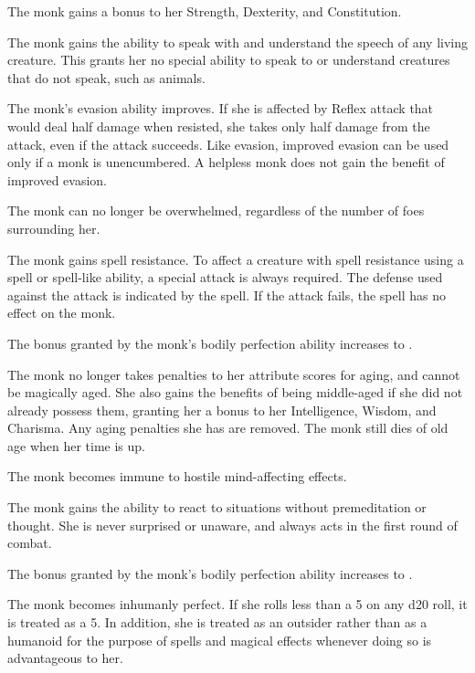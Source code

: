  The monk gains a  bonus to her Strength, Dexterity, and Constitution.

 The monk gains the ability to speak with and understand the speech of any living creature. This grants her no special ability to speak to or understand creatures that do not speak, such as animals.

 The monk's evasion ability improves. If she is affected by Reflex attack that would deal half damage when resisted, she takes only half damage from the attack, even if the attack succeeds. Like evasion, improved evasion can be used only if a monk is unencumbered. A helpless monk does not gain the benefit of improved evasion.

 The monk can no longer be overwhelmed, regardless of the number of foes surrounding her.

 The monk gains spell resistance. To affect a creature with spell resistance using a spell or spell-like ability, a special attack is always required. The defense used against the attack is indicated by the spell. If the attack fails, the spell has no effect on the monk.

 The bonus granted by the monk's bodily perfection ability increases to .

 The monk no longer takes penalties to her attribute scores for aging, and cannot be magically aged. She also gains the benefits of being middle-aged if she did not already possess them, granting her a  bonus to her Intelligence, Wisdom, and Charisma. Any aging penalties she has are removed. The monk still dies of old age when her time is up.

 The monk becomes immune to hostile mind-affecting effects.

 The monk gains the ability to react to situations without premeditation or thought. She is never surprised or unaware, and always acts in the first round of combat.

 The bonus granted by the monk's bodily perfection ability increases to .

 The monk becomes inhumanly perfect. If she rolls less than a 5 on any d20 roll, it is treated as a 5. In addition, she is treated as an outsider rather than as a humanoid for the purpose of spells and magical effects whenever doing so is advantageous to her.

